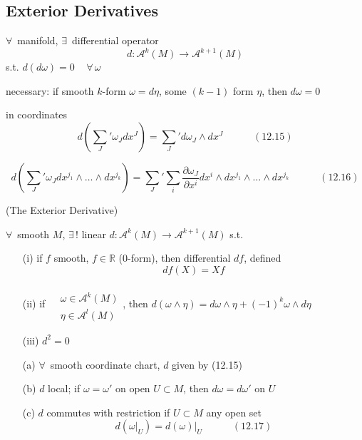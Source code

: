 \subsection*{ Exterior Derivatives }

$\forall \, $ manifold, $\exists \, $ differential operator
\[
d: \mathcal{A}^k(M) \to \mathcal{A}^{k+1}(M)
\]
s.t. $d(d\omega ) =0 \quad \, \forall \, \omega$

necessary: if smooth $k$-form $\omega = d\eta$, some $(k-1)$ form $\eta$, then $d\omega =0$

in coordinates
\begin{equation}
  d \left( \sum_J' \omega_J dx^J \right) = \sum_J' d\omega_J \wedge dx^J \quad \quad \quad (12.15)
\end{equation}

\begin{equation}
  d\left( \sum_J' \omega_J dx^{j_1} \wedge \dots \wedge dx^{j_k} \right) = \sum_J' \sum_i \frac{ \partial \omega_J}{ \partial x^i} dx^i \wedge dx^{j_1} \wedge \dots \wedge dx^{j_k} \quad \quad \quad (12.16)
\end{equation}


\begin{theorem}[12.14] (The Exterior Derivative) 

$\forall \, $ smooth $M$, $\exists \, !$ linear $d: \mathcal{A}^k(M) \to \mathcal{A}^{k+1}(M)$ s.t. 
\begin{enumerate}
\item[(i)] if $f$ smooth, $f\in \mathbb{R}$ (0-form), then differential $df$, defined 
\[
df(X) = Xf
\]
\item[(ii)] if $\begin{aligned} & \quad \\ & \omega \in \mathcal{A}^k(M) \\ & \eta \in \mathcal{A}^l(M) \end{aligned}$, then $d(\omega \wedge \eta) = d\omega \wedge \eta + (-1)^k \omega \wedge d\eta $
\item[(iii)] $d^2 =0$
\end{enumerate}
\begin{enumerate}
  \item[(a)] $\forall \, $ smooth coordinate chart, $d$ given by (12.15) 
  \item[(b)] $d$ local; if $\omega = \omega'$ on open $U \subset M$, then $d\omega = d\omega'$ on $U$
  \item[(c)] $d$ commutes with restriction if $U \subset M$ any open set
    \begin{equation}
      d(\left. \omega \right|_U ) = \left. d(\omega ) \right|_U \quad \quad \quad (12.17)
    \end{equation}
\end{enumerate}
\end{theorem}


